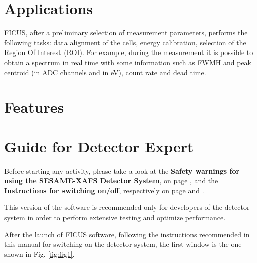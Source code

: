\documentclass[a4paper,12pt,oneside,pdflatex,italian,final,twocolumn]{article}
\begin{document}
        \section{Applications}
        
        FICUS, after a preliminary selection of measurement parameters, performs the following tasks: data alignment of the cells, energy calibration, selection of the Region Of Interest (ROI). For example, during the measurement it is possible to obtain a spectrum in real time with some information such as FWMH and peak centroid (in ADC channels and in eV), count rate and dead time.
        
        \section{Features}
            \clearpage
	
\section{Guide for Detector Expert}

Before starting any activity, please take a look at the \textbf{Safety warnings for using the SESAME-XAFS Detector System}, on page \pageref{accensione}, and the \textbf{Instructions for switching on/off}, respectively on page \pageref{accensione} and \pageref{spegnimento}.

This version of the software is recommended only for developers of the detector system in order to perform extensive testing and optimize performance.

\vspace{1cm}

After the launch of FICUS software, following the instructions recommended in this manual for switching on the detector system, the first window is the one shown in Fig. \ref{fig:fig1}.
\end{document}
